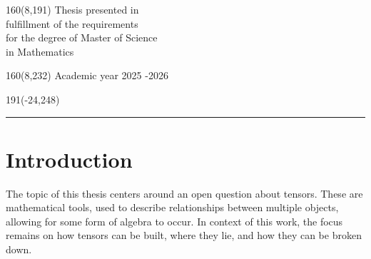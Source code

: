 \documentclass[12pt,a4paper,oneside]{book}
\theoremstyle{definition}
\begin{document}
%
\begin{textblock}{160}(8,191)
\textblockcolour{}
\vspace{-\parskip}
\flushright
Thesis presented in\\[4.5pt]
fulfillment of the requirements\\[4.5pt]
for the degree of Master of Science\\[4.5pt]
in Mathematics\\
\end{textblock}
%
\begin{textblock}{160}(8,232)
\textblockcolour{}
\vspace{-\parskip}
\flushright
Academic year 2025 -2026
\end{textblock}
%
\begin{textblock}{191}(-24,248)
{\color{blueline}\rule{550pt}{5.5pt}}
\end{textblock}
%
\vfill
\newpage

\sffamily
\setcounter{page}{0}

\tableofcontents
\listoffigures
\newpage
\setcounter{page}{0}

\chapter{Introduction}
The topic of this thesis centers around an open question about tensors. These are mathematical tools, used to describe relationships between multiple objects, allowing for some form of algebra to occur. In context of this work, the focus remains on how tensors can be built, where they lie, and how they can be broken down. 
\end{document}

